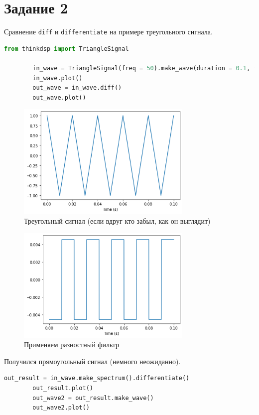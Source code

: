 \documentclass[a4paper, 12pt]{report}
\begin{document}
	\section{Задание 2}
	Сравнение \texttt{diff} и \texttt{differentiate} на примере треугольного сигнала.
	\begin{lstlisting}[language=Python,caption=И снова треугольный сигнал]
		from thinkdsp import TriangleSignal

		in_wave = TriangleSignal(freq = 50).make_wave(duration = 0.1, framerate = 44100)
		in_wave.plot()
		out_wave = in_wave.diff()
		out_wave.plot()
	\end{lstlisting}
	\begin{figure}[H]
		\centering
		\includegraphics[width=0.75\textwidth]{task1.png}
		\caption{Треугольный сигнал (если вдруг кто забыл, как он выглядит)}
		\label{fig:task1}
	\end{figure}
	\begin{figure}[H]
		\centering
		\includegraphics[width=0.75\textwidth]{task2.png}
		\caption{Применяем разностный фильтр}
		\label{fig:task2}
	\end{figure}
	Получился прямоугольный сигнал (немного неожиданно).
	\begin{lstlisting}[language=Python,caption=Применение фильтра для дифференцирования]
		out_result = in_wave.make_spectrum().differentiate()
		out_result.plot()
		out_wave2 = out_result.make_wave()
		out_wave2.plot()
	\end{lstlisting}
\end{document}

